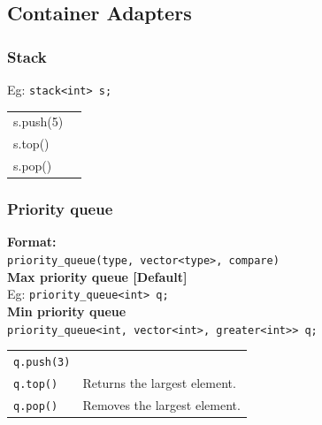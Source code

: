 \subsection{Container Adapters}

\subsubsection{Stack}
Eg: \texttt{stack<int> s;}\\

\begin{tabularx}{\linewidth}{lX}
s.push(5) & \\
s.top() & \\
s.pop() & \\
\end{tabularx}


\subsubsection{Priority queue}
\textbf{Format:}\\
\texttt{priority\_queue(type, vector<type>, compare)}\\
\textbf{Max priority queue [Default]}\\
Eg: \texttt{priority\_queue<int> q;}\\
\textbf{Min priority queue}\\
\texttt{priority\_queue<int, vector<int>, greater<int>> q;}

\begin{tabularx}{\linewidth}{lX}
\texttt{q.push(3)} & \\
\texttt{q.top()} & Returns the largest element.\\
\texttt{q.pop()} & Removes the largest element.
\end{tabularx}

\vspace{6pt}
